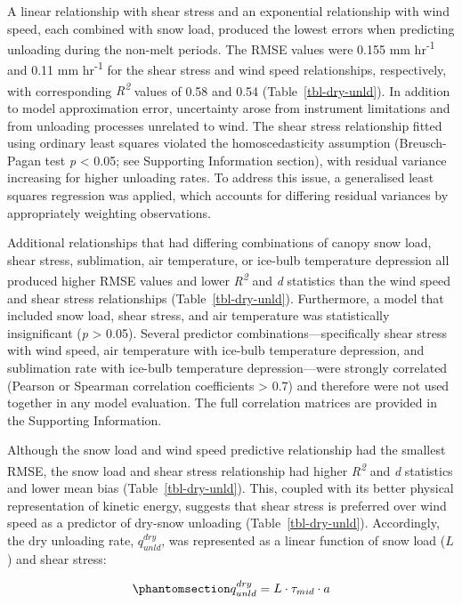 \documentclass[
]{agujournal2019}
\begin{document}
A linear relationship with shear stress and an exponential relationship
with wind speed, each combined with snow load, produced the lowest
errors when predicting unloading during the non-melt periods. The RMSE
values were 0.155 mm hr\textsuperscript{-1} and 0.11 mm
hr\textsuperscript{-1} for the shear stress and wind speed
relationships, respectively, with corresponding
\emph{R\textsuperscript{2}} values of 0.58 and 0.54
(Table~\ref{tbl-dry-unld}). In addition to model approximation error,
uncertainty arose from instrument limitations and from unloading
processes unrelated to wind. The shear stress relationship fitted using
ordinary least squares violated the homoscedasticity assumption
(Breusch-Pagan test \emph{p} \textless{} 0.05; see Supporting
Information section), with residual variance increasing for higher
unloading rates. To address this issue, a generalised least squares
regression was applied, which accounts for differing residual variances
by appropriately weighting observations.

Additional relationships that had differing combinations of canopy snow
load, shear stress, sublimation, air temperature, or ice-bulb
temperature depression all produced higher RMSE values and lower
\emph{R\textsuperscript{2}} and \emph{d} statistics than the wind speed
and shear stress relationships (Table~\ref{tbl-dry-unld}). Furthermore,
a model that included snow load, shear stress, and air temperature was
statistically insignificant (\emph{p} \textgreater{} 0.05). Several
predictor combinations---specifically shear stress with wind speed, air
temperature with ice-bulb temperature depression, and sublimation rate
with ice-bulb temperature depression---were strongly correlated (Pearson
or Spearman correlation coefficients \textgreater{} 0.7) and therefore
were not used together in any model evaluation. The full correlation
matrices are provided in the Supporting Information.

Although the snow load and wind speed predictive relationship had the
smallest RMSE, the snow load and shear stress relationship had higher
\emph{R\textsuperscript{2}} and \emph{d} statistics and lower mean bias
(Table~\ref{tbl-dry-unld}). This, coupled with its better physical
representation of kinetic energy, suggests that shear stress is
preferred over wind speed as a predictor of dry-snow unloading
(Table~\ref{tbl-dry-unld}). Accordingly, the dry unloading rate,
\(q_{unld}^{dry}\), was represented as a linear function of snow load
(\(L\)) and shear stress:

\begin{equation}\phantomsection\label{eq-q-unld-tau}{
q_{unld}^{dry} = L \cdot \tau_{mid} \cdot a
}\end{equation}
\end{document}
